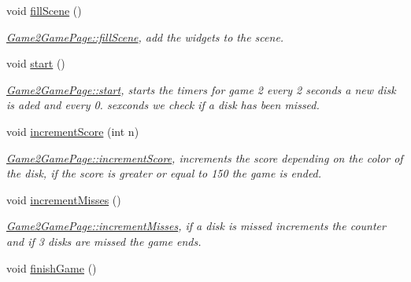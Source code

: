 \begin{DoxyCompactItemize}
void \hyperlink{classGame2GamePage_a429951c0c6df01a990fb72d3f7d2337c}{fill\+Scene} ()
\begin{DoxyCompactList}\small\item\em \hyperlink{classGame2GamePage_a429951c0c6df01a990fb72d3f7d2337c}{Game2\+Game\+Page\+::fill\+Scene}, add the widgets to the scene. \end{DoxyCompactList}\item 
\mbox{\label{classGame2GamePage_a1798ce94e5be61e961958da87976e74a}} 
void \hyperlink{classGame2GamePage_a1798ce94e5be61e961958da87976e74a}{start} ()
\begin{DoxyCompactList}\small\item\em \hyperlink{classGame2GamePage_a1798ce94e5be61e961958da87976e74a}{Game2\+Game\+Page\+::start}, starts the timers for game 2 every 2 seconds a new disk is aded and every 0. sexconds we check if a disk has been missed. \end{DoxyCompactList}\item 
\mbox{\label{classGame2GamePage_a207c02c99ac039debf2a88c8f97640d9}} 
void \hyperlink{classGame2GamePage_a207c02c99ac039debf2a88c8f97640d9}{increment\+Score} (int n)
\begin{DoxyCompactList}\small\item\em \hyperlink{classGame2GamePage_a207c02c99ac039debf2a88c8f97640d9}{Game2\+Game\+Page\+::increment\+Score}, increments the score depending on the color of the disk, if the score is greater or equal to 150 the game is ended. \end{DoxyCompactList}\item 
\mbox{\label{classGame2GamePage_ae761cb98aae235cb055734640943acc5}} 
void \hyperlink{classGame2GamePage_ae761cb98aae235cb055734640943acc5}{increment\+Misses} ()
\begin{DoxyCompactList}\small\item\em \hyperlink{classGame2GamePage_ae761cb98aae235cb055734640943acc5}{Game2\+Game\+Page\+::increment\+Misses}, if a disk is missed increments the counter and if 3 disks are missed the game ends. \end{DoxyCompactList}\item 
\mbox{\label{classGame2GamePage_ac67671d38d267c23d6e58af95056d164}} 
void \hyperlink{classGame2GamePage_ac67671d38d267c23d6e58af95056d164}{finish\+Game} ()

\end{DoxyCompactItemize}
